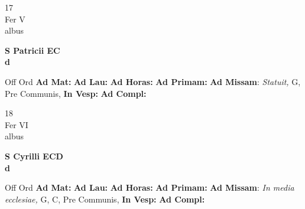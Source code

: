 \documentclass[10pt, openany]{book}
\begin{document}
    \begin{center}
        \begin{minipage}{3.5in}
            \vspace{2em}
            \begin{minipage}{0.5in}
                {\Huge 17} \\
                {\normalsize Fer V} \\
                {\normalsize albus}
            \end{minipage}
            \begin{minipage}{3.0in}
                \textbf{ \large S Patricii EC \\
                \textnormal{\normalsize d}} \\ 
            \end{minipage}
            \begin{justify}Off Ord
                \textbf{Ad Mat: }
                \textbf{Ad Lau: }
                \textbf{Ad Horas: }
                \textbf{Ad Primam: }\textbf{Ad Missam}: \textit{Statuit,} G, Pre Communis,  
                \textbf{In Vesp: }
                \textbf{Ad Compl: }
            \end{justify}
        \end{minipage}
    \end{center}

    \begin{center}
        \begin{minipage}{3.5in}
            \vspace{2em}
            \begin{minipage}{0.5in}
                {\Huge 18} \\
                {\normalsize Fer VI} \\
                {\normalsize albus}
            \end{minipage}
            \begin{minipage}{3.0in}
                \textbf{ \large S Cyrilli ECD \\
                \textnormal{\normalsize d}} \\ 
            \end{minipage}
            \begin{justify}Off Ord
                \textbf{Ad Mat: }
                \textbf{Ad Lau: }
                \textbf{Ad Horas: }
                \textbf{Ad Primam: }\textbf{Ad Missam}: \textit{In media ecclesiae,} G, C, Pre Communis,  
                \textbf{In Vesp: }
                \textbf{Ad Compl: }
            \end{justify}
        \end{minipage}
    \end{center}
\end{document}
